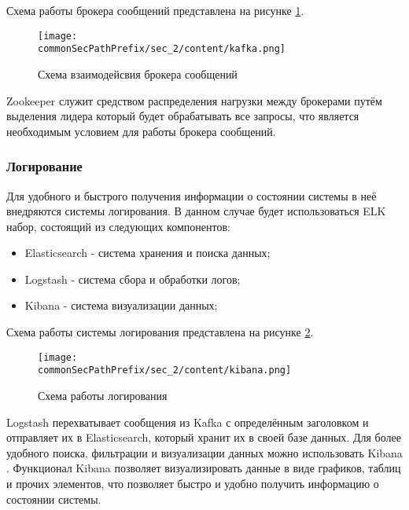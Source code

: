 Схема работы брокера сообщений представлена на рисунке \ref{fig:kafka}.

\begin{figure}[ht]
    \centering
    \texttt{[image: \\commonSecPathPrefix/sec\_2/content/kafka.png]}
    \caption{Схема взаимодейсвия брокера сообщений}
    \label{fig:kafka}
\end{figure}

Zookeeper служит средством распределения нагрузки между брокерами путём выделения лидера который будет обрабатывать все запросы,
что является необходимым условием для работы брокера сообщений.

\subsubsection{Логирование}

Для удобного и быстрого получения информации о состоянии системы в неё внедряются системы логирования.
В данном случае будет использоваться ELK набор, состоящий из следующих компонентов:
\begin{itemize}
    \item Elasticsearch - система хранения и поиска данных;
    \item Logstash - система сбора и обработки логов;
    \item Kibana - система визуализации данных;
\end{itemize}

Схема работы системы логирования представлена на рисунке \ref{fig:kibana}.

\begin{figure}[ht]
    \centering
    \texttt{[image: \\commonSecPathPrefix/sec\_2/content/kibana.png]}
    \caption{Схема работы логирования}
    \label{fig:kibana}
\end{figure}

Logstash перехватывает сообщения из Kafka с определённым заголовком и отправляет их в Elasticsearch, который хранит их в своей базе данных.
Для более удобного поиска, фильтрации и визуализации данных можно использовать Kibana \cite{kibanaDocs}. Функционал Kibana позволяет визуализировать данные
в виде графиков, таблиц и прочих элементов, что позволяет быстро и удобно получить информацию о состоянии системы.